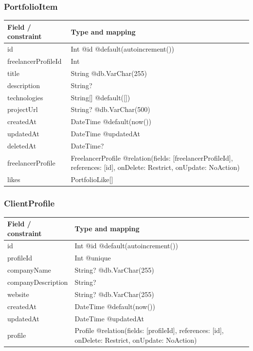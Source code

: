 \subsubsection{PortfolioItem}
\begin{longtable}{|L{3.3cm}|L{10.8cm}|}\hline
Field / constraint & Type and mapping \\ \hline
id & Int @id @default(autoincrement()) \\ \hline
freelancerProfileId & Int \\ \hline
title & String @db.VarChar(255) \\ \hline
description & String? \\ \hline
technologies & String[] @default([]) \\ \hline
projectUrl & String? @db.VarChar(500) \\ \hline
createdAt & DateTime @default(now()) \\ \hline
updatedAt & DateTime @updatedAt \\ \hline
deletedAt & DateTime? \\ \hline
freelancerProfile & FreelancerProfile @relation(fields: [freelancerProfileId], references: [id], onDelete: Restrict, onUpdate: NoAction) \\ \hline
likes & PortfolioLike[] \\ \hline
\end{longtable}
\subsubsection{ClientProfile}
\begin{longtable}{|L{3.3cm}|L{10.8cm}|}\hline
Field / constraint & Type and mapping \\ \hline
id & Int @id @default(autoincrement()) \\ \hline
profileId & Int @unique \\ \hline
companyName & String? @db.VarChar(255) \\ \hline
companyDescription & String? \\ \hline
website & String? @db.VarChar(255) \\ \hline
createdAt & DateTime @default(now()) \\ \hline
updatedAt & DateTime @updatedAt \\ \hline
profile & Profile @relation(fields: [profileId], references: [id], onDelete: Restrict, onUpdate: NoAction) \\ \hline
\end{longtable}
